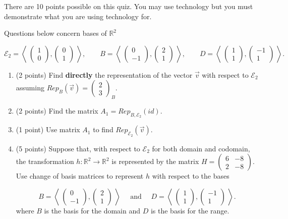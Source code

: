 \documentclass[12pt]{article}
\renewcommand{\emph}[1]{\textsf{\textbf{#1}}}
\def\bpm{\begin{pmatrix}}
\def\epm{\end{pmatrix}}
\begin{document}

There are 10 points possible on this quiz. You may use technology but you must demonstrate what you are using technology for.

Questions below concern bases of $\mathbb{R}^2$ 

$$\mathcal{E}_2=\left \langle \: \bpm 1\\0  \epm, \bpm 0\\1  \epm \: \right \rangle, \quad \quad
B=\left \langle \:  \bpm 0\\-1  \epm, \bpm 2\\1  \epm \: \right \rangle, \quad \quad
D=\left \langle \: \bpm 1\\1  \epm, \bpm -1\\1  \epm   \: \right \rangle. $$


\begin{enumerate}
\item (2 points) Find \emph{directly} the representation of the vector $\vec{v}$ with respect to $\mathcal{E}_2$ assuming $Rep_B(\vec{v})=\bpm 2\\3\epm_B.$
\vfill
\item (2 points) Find the matrix $A_1=Rep_{B,\mathcal{E}_2}(id).$
\vfill
\item (1 point) Use matrix $A_1$ to find $Rep_{\mathcal{E}_2} (\vec{v}).$
\vfill
\newpage
\item (5 points) Suppose that, with respect to $\mathcal{E}_2$ for both domain and codomain, the transformation $h: \mathbb{R}^2 \to \mathbb{R}^2$ is represented by the matrix $H=\bpm 6&-8\\2&-8 \epm.$ Use change of basis matrices to represent $h$ with respect to the bases 

$$
B=\left \langle \:  \bpm 0\\-1  \epm, \bpm 2\\1  \epm \: \right \rangle \quad  \text{ and } \quad
D=\left \langle \: \bpm 1\\1  \epm, \bpm -1\\1  \epm   \: \right \rangle. $$
where $B$ is the basis for the domain and $D$ is the basis for the range. 

\end{enumerate}	
\end{document}
